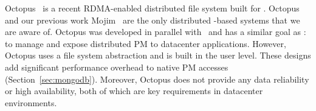 Octopus~\cite{Octopus} is a recent RDMA-enabled distributed file system built for \nvm.
Octopus and our previous work Mojim~\cite{Zhang15-Mojim} are the only distributed \nvm-based systems that we are aware of.
Octopus was developed in parallel with \hotpot\ and has a similar goal as \hotpot: 
to manage and expose distributed PM to datacenter applications. 
However, Octopus uses a file system abstraction and is built in the user level.
These designs add significant performance overhead to native PM accesses (Section~\ref{sec:mongodb}).
Moreover, Octopus does not provide any data reliability or high availability, 
both of which are key requirements in datacenter environments.
